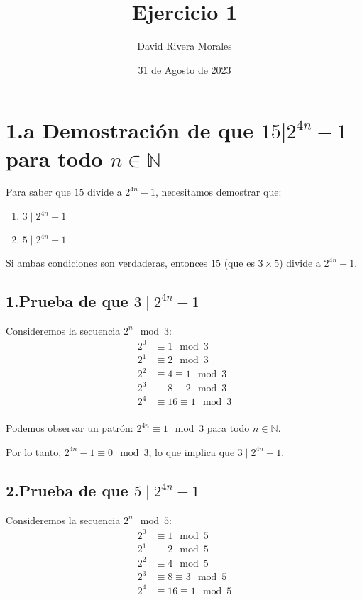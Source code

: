 \documentclass{article}
\begin{document}
\title{Ejercicio 1}
\author{David Rivera Morales}
\date{31 de Agosto de 2023}
\maketitle

\section*{1.a Demostración de que $15 | 2^{4n} - 1$ para todo $n \in \mathbb{N}$}

Para saber que $15$ divide a $2^{4n} - 1$, necesitamos demostrar que:
\begin{enumerate}
    \item $3 \mid 2^{4n} - 1$
    \item $5 \mid 2^{4n} - 1$
\end{enumerate}

Si ambas condiciones son verdaderas, entonces $15$ (que es $3 \times 5$) divide a $2^{4n} - 1$.

\subsection*{1.Prueba de que $3 \mid 2^{4n} - 1$}

Consideremos la secuencia $2^n \mod 3$:
\begin{align*}
2^0 &\equiv 1 \mod 3 \\
2^1 &\equiv 2 \mod 3 \\
2^2 &\equiv 4 \equiv 1 \mod 3 \\
2^3 &\equiv 8 \equiv 2 \mod 3 \\
2^4 &\equiv 16 \equiv 1 \mod 3 \\
\end{align*}

Podemos observar un patrón: $2^{4n} \equiv 1 \mod 3$ para todo $n \in \mathbb{N}$.

Por lo tanto, $2^{4n} - 1 \equiv 0 \mod 3$, lo que implica que $3 \mid 2^{4n} - 1$.

\subsection*{2.Prueba de que $5 \mid 2^{4n} - 1$}

Consideremos la secuencia $2^n \mod 5$:
\begin{align*}
2^0 &\equiv 1 \mod 5 \\
2^1 &\equiv 2 \mod 5 \\
2^2 &\equiv 4 \mod 5 \\
2^3 &\equiv 8 \equiv 3 \mod 5 \\
2^4 &\equiv 16 \equiv 1 \mod 5 \\
\end{align*}
\end{document}
